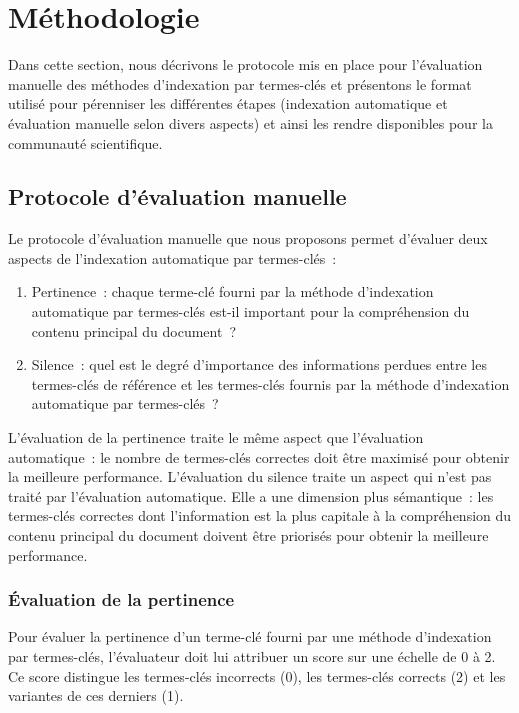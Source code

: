 
  \section{Méthodologie}
  \label{section:main-automatic_evaluation_of_keyphrase_annotation-methodology}
    Dans cette section, nous décrivons le protocole mis en place pour
    l'évaluation manuelle des méthodes d'indexation par termes-clés et
    présentons le format utilisé pour pérenniser les différentes étapes
    (indexation automatique et évaluation manuelle selon divers aspects) et
    ainsi les rendre disponibles pour la communauté scientifique.

    \subsection{Protocole d'évaluation manuelle}
    \label{subsec:main-automatic_evaluation_of_keyphrase_annotation-methodology-evaluation_protocol}
      Le protocole d'évaluation manuelle que nous proposons permet d'évaluer
      deux aspects de l'indexation automatique par termes-clés~:
      \begin{enumerate}
        \item{Pertinence~: chaque terme-clé fourni par la méthode d'indexation
              automatique par termes-clés est-il important pour la compréhension
              du contenu principal du document~?}
        \item{Silence~: quel est le degré d'importance des informations perdues
              entre les termes-clés de référence et les termes-clés fournis par
              la méthode d'indexation automatique par termes-clés~?}
      \end{enumerate}
      L'évaluation de la pertinence traite le même aspect que l'évaluation
      automatique~: le nombre de termes-clés correctes doit être maximisé pour
      obtenir la meilleure performance. L'évaluation du silence traite un aspect
      qui n'est pas traité par l'évaluation automatique. Elle a une dimension
      plus sémantique~: les termes-clés correctes dont l'information est la plus
      capitale à la compréhension du contenu principal du document doivent être
      priorisés pour obtenir la meilleure performance.

      \subsubsection{Évaluation de la pertinence}
      \label{subsubsec:main-automatic_evaluation_of_keyphrase_annotation-methodology-evaluation_protocol-relevancy}
        Pour évaluer la pertinence d'un terme-clé fourni par une méthode
        d'indexation par termes-clés, l'évaluateur doit lui attribuer un score
        sur une échelle de 0 à 2. Ce score distingue les termes-clés incorrects
        (0), les termes-clés corrects (2) et les variantes de ces derniers (1).

